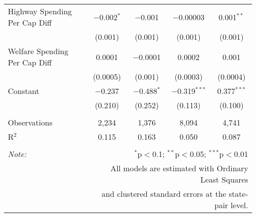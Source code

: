 \begin{table}[!htbp]
\begin{tabular}{@{\extracolsep{5pt}}lcccc}
  Highway Spending Per Cap Diff & $-$0.002$^{*}$ & $-$0.001 & $-$0.00003 & 0.001$^{**}$ \\ 
  & (0.001) & (0.001) & (0.001) & (0.001) \\ 
  Welfare Spending Per Cap Diff & 0.0001 & $-$0.0001 & 0.0002 & 0.001 \\ 
  & (0.0005) & (0.001) & (0.0003) & (0.0004) \\ 
  Constant & $-$0.237 & $-$0.488$^{*}$ & $-$0.319$^{***}$ & 0.377$^{***}$ \\ 
  & (0.210) & (0.252) & (0.113) & (0.100) \\ 
 \hline \\[-1.8ex] 
Observations & 2,234 & 1,376 & 8,094 & 4,741 \\ 
R$^{2}$ & 0.115 & 0.163 & 0.050 & 0.087 \\ 
\hline 
\hline \\[-1.8ex] 
\textit{Note:}  & \multicolumn{4}{r}{$^{*}$p$<$0.1; $^{**}$p$<$0.05; $^{***}$p$<$0.01} \\ 
 & \multicolumn{4}{r}{All models are estimated with Ordinary Least Squares} \\ 
 & \multicolumn{4}{r}{and clustered standard errors at the state-pair level.} \\ 
\end{tabular} 
\end{table} 
